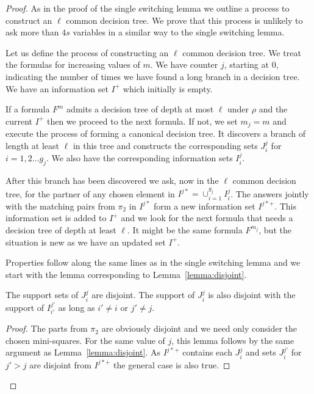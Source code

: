 \documentclass{article}\usepackage[a4paper,margin=20mm]{geometry}
\begin{document}
\begin{proof}
As in the proof of the single switching lemma 
we outline a process to construct an $\ell$ common decision tree.
We prove that this process is unlikely to ask more than
$4s$ variables in a similar way to the single switching
lemma.

Let us define the process of constructing an $\ell$ common
decision tree.  
We treat the formulas for increasing values of $m$.
We have counter $j$, starting at $0$, indicating the number
of times we have found a long branch in a decision tree.  
We have an information set $I^+$ which initially is empty.

If a formula $F^m$ admits
a decision tree of depth at most $\ell$ under $\rho$ and
the current $I^+$ then we proceed
to the next formula.  
If not, we set $m_j=m$ and
execute the process of forming a canonical
decision tree.  It discovers a branch of length at least
$\ell$ in this tree and constructs
the corresponding sets $J_i^j$ for $i=1, 2 \ldots g_j$.
We also have the corresponding information sets $I_i^j$.  

After this branch has been discovered we ask, now
in the $\ell$ common decision tree, for the
partner of any chosen element in $I^{j*}= \cup_{i=1}^{g_j} I_i^j$.
The answers jointly with the matching pairs from $\pi_2$ in 
$I^{j*}$ form a new information set $I^{j*+}$.
This information set is added to $I^+$ and we
look for the next formula that needs a decision
tree of depth at least $\ell$.  It might be the
same formula $F^{m_j}$, but the situation is new as
we have an updated set $I^+$.

Properties follow along the same lines as in the
single switching lemma and we start with the lemma
corresponding to Lemma~\ref{lemma:disjoint}.

\begin{lemma}\label{lemma:mdisjoint}
The support sets of $J_i^j$ are disjoint.  The support of
$J_i^j$ is also disjoint with the support of $I_{i'}^{j'}$ as
long as $i'\not= i$ or $j'\not= j$.
\end{lemma}

\begin{proof}
The parts from $\pi_2$ are obviously disjoint and
we need only consider the chosen mini-squares.
For the same value of $j$, this lemma follows by the
same argument as Lemma~\ref{lemma:disjoint}.  As $I^{j*+}$
contains each $J^{j}_i$ and sets $J_i^{j'}$ for $j'> j$ are
disjoint from $I^{j*+}$ the general case is
also true.
\end{proof}


\end{proof}
\end{document}
